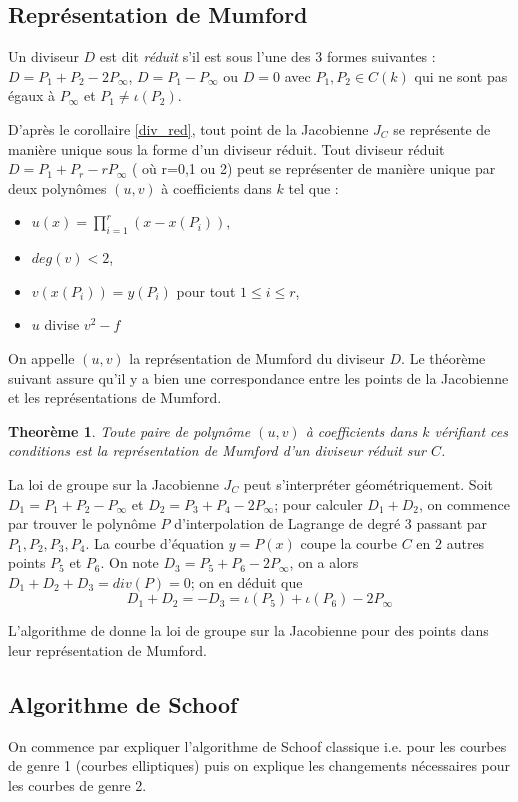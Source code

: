 \documentclass[a4paper]{article}
\newtheorem{theoreme}{Theorème}[section]
\theoremstyle{definition}
\theoremstyle{remark}
\numberwithin{equation}{section}
\begin{document}
\subsection{Représentation de Mumford}
Un diviseur $D$ est dit \emph{réduit} s'il est sous l'une des 3 formes suivantes : $D = P_1 + P_2 - 2P_\infty$, $D = P_1 - P_\infty$ ou $D=0$ avec $P_1,P_2 \in C(k)$ qui ne sont pas égaux à $P_\infty$ et $P_1 \neq \iota(P_2)$.

D'après le corollaire \eqref{div_red}, tout point de la Jacobienne $J_C$ se représente de manière unique sous la forme d'un diviseur réduit. Tout diviseur réduit $D = P_1 + P_r - rP_\infty$ ( où r=0,1 ou 2) peut se représenter de manière unique par deux polynômes $(u,v)$ à coefficients dans $k$ tel que :
\begin{itemize}
\item $u(x) =  \prod_{i=1}^r (x - x(P_i) )$,
\item $deg(v) < 2$,
\item $v(x(P_i)) = y(P_i)$ pour tout $1 \leq i \leq r$,
\item $u$ divise $v^2 - f$
\end{itemize}
On appelle $(u,v)$ la représentation de Mumford du diviseur $D$.
Le théorème suivant assure qu'il y a bien une correspondance entre les points de la Jacobienne et les représentations de Mumford.

\begin{theoreme}
Toute paire de polynôme $(u,v)$ à coefficients dans $k$ vérifiant ces conditions est la représentation de Mumford d'un diviseur réduit sur $C$.
\end{theoreme}

La loi de groupe sur la Jacobienne $J_C$ peut s'interpréter géométriquement. Soit $D_1 = P_1 + P_2 - P_\infty$ et $D_2 = P_3 + P_4 - 2P_\infty$; pour calculer $D_1 + D_2$, on commence par trouver le polynôme $P$ d'interpolation de Lagrange de degré $3$ passant par $P_1,P_2,P_3,P_4$. La courbe d'équation $y = P(x)$ coupe la courbe $C$ en $2$ autres points $P_5$ et $P_6$. On note $D_3 = P_5 + P_6 - 2P_\infty$, on a alors $D_1 + D_2 + D_3 = div(P) = 0$; on en déduit que
$$D_1 + D_2 = -D_3 = \iota(P_5) + \iota(P_6) - 2P_\infty$$

L'algorithme de \citet{cantor} donne la loi de groupe sur la Jacobienne pour des points dans leur représentation de Mumford.

\subsection{Algorithme de Schoof}
\label{algoSchoof}
On commence par expliquer l'algorithme de Schoof classique i.e. pour les courbes de genre 1 (courbes elliptiques) puis on explique les changements nécessaires pour les courbes de genre 2.
\end{document}
